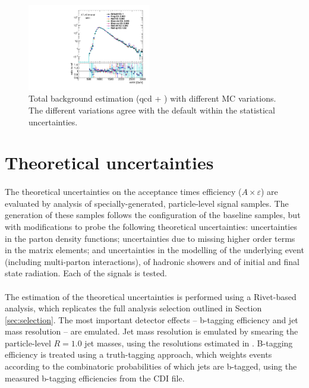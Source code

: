 \begin{figure}[htbp!]
\begin{center} 
\includegraphics[width=0.48\textwidth,angle=-90]{figures/boosted/Other/directcompare_mHH_l_1_TwoTag_split_Top_syst_stat_postfit_all_.pdf}
\caption{Total background estimation (qcd + \ttbar) with different \ttbar MC variations. The different variations agree with the default within the statistical uncertainties.}
\label{fig:ttbar-MC}
\end{center}
\end{figure}

\section{Theoretical uncertainties}
\label{sec:boosted-systematics-theory}
\paragraph{}
The theoretical uncertainties on the acceptance times efficiency ($A\times\varepsilon$) are evaluated by analysis of specially-generated, particle-level signal samples. 
The generation of these samples follows the configuration of the baseline samples, but with modifications to probe the following theoretical uncertainties: uncertainties in the parton density functions; uncertainties due to missing higher order terms in the matrix elements; and uncertainties in the modelling of the underlying event (including multi-parton interactions), of hadronic showers and of initial and final state radiation. Each of the signals is tested.

\paragraph{}
The estimation of the theoretical uncertainties is performed using a Rivet-based analysis, which replicates the full analysis selection outlined in Section \ref{sec:selection}. The most important detector effects -- b-tagging efficiency and jet mass resolution -- are emulated. Jet mass resolution is emulated by smearing the particle-level $R=1.0$ jet masses, using the resolutions estimated in \cite{ATLAS-CONF-2016-035}. B-tagging efficiency is treated using a truth-tagging approach, which weights events according to the combinatoric probabilities of which jets are b-tagged, using the measured b-tagging efficiencies from the CDI file. 

